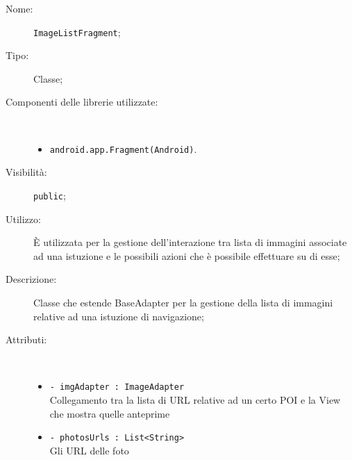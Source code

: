 \documentclass[../DefinizioneDiProdotto.tex]{subfiles}
\begin{document}
    \begin{description}
\item[Nome:] \texttt{ImageListFragment};
\item[Tipo:] Classe;
\item[Componenti delle librerie utilizzate:] \
\begin{itemize}
\item \texttt{android.app.Fragment(Android)}.

\end{itemize}
\item[Visibilità:] \texttt{public};
\item[Utilizzo:] È utilizzata per la gestione dell'interazione tra lista di immagini associate ad una istuzione e le possibili azioni che è possibile effettuare su di esse;
\item[Descrizione:] Classe che estende BaseAdapter per la gestione della lista di immagini relative ad una istuzione di navigazione;
\item[Attributi:] \
\begin{itemize}
\item \texttt{- imgAdapter : ImageAdapter}\\
Collegamento tra la lista di URL relative ad un certo POI e la View che mostra quelle anteprime

\item \texttt{- photosUrls : List<String>}\\
Gli URL delle foto


\end{itemize}
\end{description}
\end{document}
